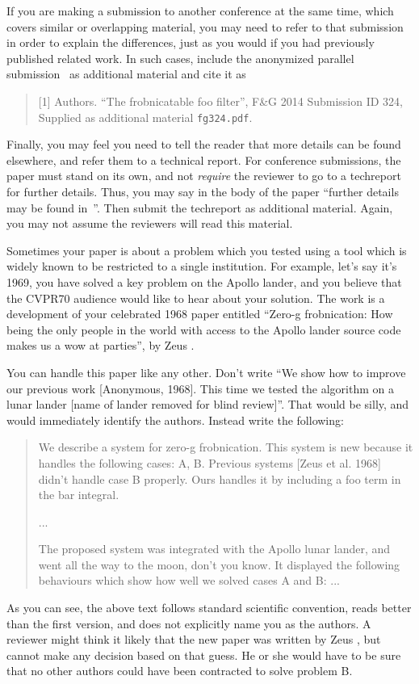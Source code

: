 \documentclass[10pt,twocolumn,letterpaper]{article}
\begin{document}
If you are making a submission to another conference at the same time,
which covers similar or overlapping material, you may need to refer to that
submission in order to explain the differences, just as you would if you
had previously published related work.  In such cases, include the
anonymized parallel submission~\cite{Authors14} as additional material and
cite it as
\begin{quote}
[1] Authors. ``The frobnicatable foo filter'', F\&G 2014 Submission ID 324,
Supplied as additional material {\tt fg324.pdf}.
\end{quote}

Finally, you may feel you need to tell the reader that more details can be
found elsewhere, and refer them to a technical report.  For conference
submissions, the paper must stand on its own, and not {\em require} the
reviewer to go to a techreport for further details.  Thus, you may say in
the body of the paper ``further details may be found
in~\cite{Authors14b}''.  Then submit the techreport as additional material.
Again, you may not assume the reviewers will read this material.

Sometimes your paper is about a problem which you tested using a tool which
is widely known to be restricted to a single institution.  For example,
let's say it's 1969, you have solved a key problem on the Apollo lander,
and you believe that the CVPR70 audience would like to hear about your
solution.  The work is a development of your celebrated 1968 paper entitled
``Zero-g frobnication: How being the only people in the world with access to
the Apollo lander source code makes us a wow at parties'', by Zeus \etal.

You can handle this paper like any other.  Don't write ``We show how to
improve our previous work [Anonymous, 1968].  This time we tested the
algorithm on a lunar lander [name of lander removed for blind review]''.
That would be silly, and would immediately identify the authors. Instead
write the following:
\begin{quotation}
\noindent
   We describe a system for zero-g frobnication.  This
   system is new because it handles the following cases:
   A, B.  Previous systems [Zeus et al. 1968] didn't
   handle case B properly.  Ours handles it by including
   a foo term in the bar integral.

   ...

   The proposed system was integrated with the Apollo
   lunar lander, and went all the way to the moon, don't
   you know.  It displayed the following behaviours
   which show how well we solved cases A and B: ...
\end{quotation}
As you can see, the above text follows standard scientific convention,
reads better than the first version, and does not explicitly name you as
the authors.  A reviewer might think it likely that the new paper was
written by Zeus \etal, but cannot make any decision based on that guess.
He or she would have to be sure that no other authors could have been
contracted to solve problem B.
\medskip
\end{document}
